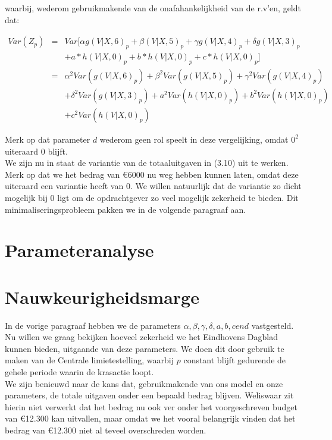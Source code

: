 waarbij, wederom gebruikmakende van de onafahankelijkheid van de r.v'en, geldt dat:

\begin{eqnarray*}
    Var(Z_{p}) & = & Var[\alpha g(V|X,6)_{p} + \beta(V|X,5)_{p} + \gamma g(V|X,4)_{p} + \delta g(V|X,3)_{p}\\
    & & + a*h(V|X,0)_{p} +b*h(V|X,0)_{p} +c*h(V|X,0)_{p}] \\  
    & = & \alpha^{2}Var(g(V|X,6)_{p}) + \beta^{2}Var(g(V|X,5)_{p}) + \gamma^{2}Var(g(V|X,4)_{p}) \\
    & & + \delta^{2}Var(g(V|X,3)_{p}) + a^{2}Var(h(V|X,0)_{p}) + b^{2}Var(h(V|X,0)_{p}) \\ & & + c^{2}Var(h(V|X,0)_{p})
\end{eqnarray*}

Merk op dat parameter $d$ wederom geen rol speelt in deze vergelijking, omdat $0^{2}$ uiteraard $0$ blijft.\\

We zijn nu in staat de variantie van de totaaluitgaven in (3.10) uit te werken. Merk op dat we het bedrag van \euro6000 nu weg hebben kunnen laten, omdat deze uiteraard een variantie heeft van 0. We willen natuurlijk dat de variantie zo dicht mogelijk bij 0 ligt om de opdrachtgever zo veel mogelijk zekerheid te bieden. Dit minimaliseringsprobleem pakken we in de volgende paragraaf aan.

\section{Parameteranalyse}

\section{Nauwkeurigheidsmarge}

In de vorige paragraaf hebben we de parameters $\alpha, \beta, \gamma, \delta, a,b,c en d$ vastgesteld. Nu willen we graag bekijken hoeveel zekerheid we het Eindhovens Dagblad kunnen bieden, uitgaande van deze parameters. We doen dit door gebruik te maken van de Centrale limietestelling, waarbij $p$ constant blijft gedurende de gehele periode waarin de krasactie loopt.\\

We zijn benieuwd naar de kans dat, gebruikmakende van ons model en onze parameters, de totale uitgaven onder een bepaald bedrag blijven. Weliswaar zit hierin niet verwerkt dat het bedrag nu ook ver onder het voorgeschreven budget van \euro12.300 kan uitvallen, maar omdat we het vooral belangrijk vinden dat het bedrag van \euro12.300 niet al teveel overschreden worden. 

